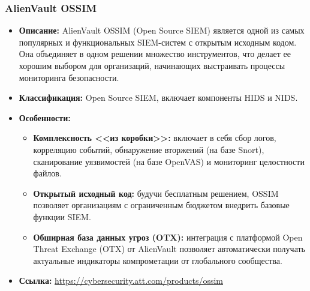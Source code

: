 \subsubsection{AlienVault OSSIM}
\begin{itemize}
		\item \textbf{Описание:} AlienVault OSSIM (Open Source SIEM) является одной из самых популярных и функциональных SIEM-систем с открытым исходным кодом. Она объединяет в одном решении множество инструментов, что делает ее хорошим выбором для организаций, начинающих выстраивать процессы мониторинга безопасности.
    \item \textbf{Классификация:} Open Source SIEM, включает компоненты HIDS и NIDS.
    \item \textbf{Особенности:}
    \begin{itemize}
        \item \textbf{Комплексность <<из коробки>>:} включает в себя сбор логов, корреляцию событий, обнаружение вторжений (на базе Snort), сканирование уязвимостей (на базе OpenVAS) и мониторинг целостности файлов.
        \item \textbf{Открытый исходный код:} будучи бесплатным решением, OSSIM позволяет организациям с ограниченным бюджетом внедрить базовые функции SIEM.
        \item \textbf{Обширная база данных угроз (OTX):} интеграция с платформой Open Threat Exchange (OTX) от AlienVault позволяет автоматически получать актуальные индикаторы компрометации от глобального сообщества.
    \end{itemize}
    \item \textbf{Ссылка:} \url{https://cybersecurity.att.com/products/ossim}
\end{itemize}

